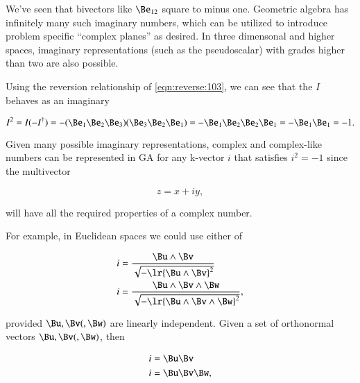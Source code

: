 %
%
We've seen that bivectors like \( \Be_{12} \) square to minus one.
Geometric algebra has infinitely many such imaginary numbers, which can be utilized to introduce problem specific ``complex planes'' as desired.
In three dimensonal and higher spaces, imaginary representations
(such as the  pseudoscalar) with grades higher than two are also possible.

Using the reversion relationship of \cref{eqn:reverse:103}, we can see that the \( I \) behaves as an imaginary

\begin{dmath}\label{eqn:R3PseudoscalarSquare:10}
I^2
=
I (-I^\dagger)
=
-
(\Be_1 \Be_2 \Be_3)(\Be_3 \Be_2 \Be_1)
=
-
\Be_1 \Be_2 \Be_2 \Be_1
=
-
\Be_1 \Be_1
=
-1.
\end{dmath}

Given many possible imaginary representations, complex and complex-like numbers can be represented in GA for any k-vector \( i \) that satisfies \( i^2 = -1 \) since the multivector

\begin{dmath}\label{eqn:complex:260}
z = x + i y,
\end{dmath}

will have all the required properties of a complex number.

For example, in Euclidean spaces we could use either of

\begin{dmath}\label{eqn:complex:280}
\begin{aligned}
i &= \frac{\Bu \wedge \Bv}{\sqrt{-\lr{\Bu\wedge\Bv}^2}} \\
i &= \frac{\Bu \wedge \Bv \wedge \Bw}{\sqrt{-\lr{\Bu\wedge\Bv\wedge \Bw}^2}},
\end{aligned}
\end{dmath}

provided \( \Bu, \Bv (,\Bw) \) are linearly independent.
Given a set of orthonormal vectors \( \Bu, \Bv (,\Bw) \), then

\begin{dmath}\label{eqn:complex:300}
\begin{aligned}
i &= \Bu \Bv \\
i &= \Bu \Bv \Bw,
\end{aligned}
\end{dmath}

